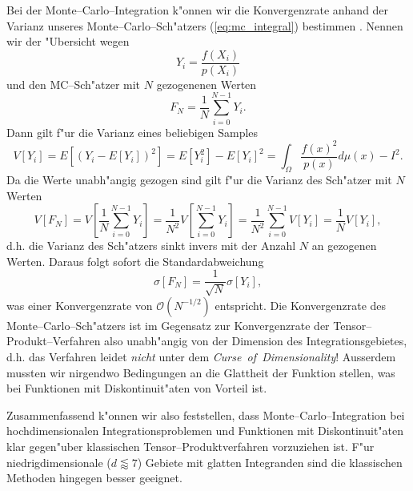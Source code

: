 	Bei der Monte--Carlo--Integration k"onnen wir die Konvergenzrate anhand der Varianz unseres Monte--Carlo--Sch"atzers (\ref{eq:mc_integral}) bestimmen \citep[][2.4.1]{Veach:1997p9136}. Nennen wir der "Ubersicht wegen
	$$Y_i=\frac{f(X_i)}{p(X_i)}$$
	und den MC--Sch"atzer mit $N$ gezogenenen Werten
	$$F_N=\frac{1}{N}\sum_{i=0}^{N-1} Y_i.$$
	Dann gilt f"ur die Varianz eines beliebigen Samples
	\begin{equation}
		V[Y_i]=E[(Y_i-E[Y_i])^2]=E[Y_i^2]-E[Y_i]^2=\int_\Omega \frac{f(x)^2}{p(x)}d\mu(x)-I^2.
		\label{eq:mc_variance}
	\end{equation}
	Da die Werte unabh"angig gezogen sind gilt f"ur die Varianz des Sch"atzer mit $N$ Werten
	$$V[F_N]=V\left[\frac{1}{N}\sum_{i=0}^{N-1}Y_i\right]=\frac{1}{N^2}V\left[\sum_{i=0}^{N-1}Y_i\right]=\frac{1}{N^2}\sum_{i=0}^{N-1}V[Y_i]=\frac{1}{N}V[Y_i],$$
	d.h. die Varianz des Sch"atzers sinkt invers mit der Anzahl $N$ an gezogenen Werten. Daraus folgt sofort die Standardabweichung
	\begin{equation}
		\sigma[F_N]=\frac{1}{\sqrt{N}}\sigma[Y_i],
		\label{eq:mc_standarddeviation}
	\end{equation}
	was einer Konvergenzrate von $\mathcal{O}(N^{-1/2})$ entspricht. Die Konvergenzrate des Monte--Carlo--Sch"atzers ist im Gegensatz zur Konvergenzrate der Tensor--Produkt--Verfahren also unabh"angig von der Dimension des Integrationsgebietes, d.h. das Verfahren leidet {\em nicht} unter dem {\em Curse~of~Dimensionality}! Ausserdem mussten wir nirgendwo Bedingungen an die Glattheit der Funktion stellen, was bei Funktionen mit Diskontinuit"aten von Vorteil ist.
	
	Zusammenfassend k"onnen wir also feststellen, dass Monte--Carlo--Integration bei hochdimensionalen Integrationsproblemen und Funktionen mit Diskontinuit"aten klar gegen"uber klassischen Tensor--Produktverfahren vorzuziehen ist. F"ur niedrigdimensionale ($d\lessapprox 7$) Gebiete mit glatten Integranden sind die klassischen Methoden hingegen besser geeignet.
	
	
